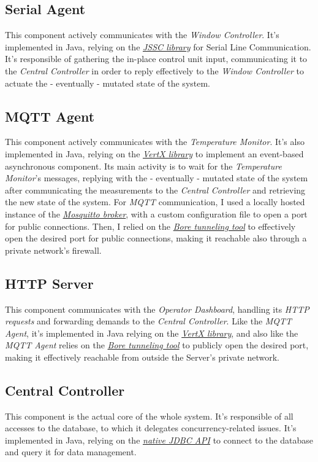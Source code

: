 \documentclass[a4paper,12pt]{report}
\begin{document}
		\subsection{Serial Agent}
		This component actively communicates with the \textit{Window Controller}. It's implemented in Java, relying on the \href{https://github.com/java-native/jssc}{\textit{JSSC library}} for Serial Line Communication. It's responsible of gathering the in-place control unit input, communicating it to the \textit{Central Controller} in order to reply effectively to the \textit{Window Controller} to actuate the - eventually - mutated state of the system.
		\subsection{MQTT Agent}
		This component actively communicates with the \textit{Temperature Monitor}. It's also implemented in Java, relying on the \href{https://vertx.io/}{\textit{VertX library}} to implement an event-based asynchronous component. Its main activity is to wait for the \textit{Temperature Monitor}'s messages, replying with the - eventually - mutated state of the system after communicating the measurements to the \textit{Central Controller} and retrieving the new state of the system.
		For \textit{MQTT} communication, I used a locally hosted instance of the \href{https://mosquitto.org/}{\textit{Mosquitto broker}}, with a custom configuration file to open a port for public connections. Then, I relied on the \href{https://github.com/ekzhang/bore}{\textit{Bore tunneling tool}} to effectively open the desired port for public connections, making it reachable also through a private network's firewall.
		\subsection{HTTP Server}
		This component communicates with the \textit{Operator Dashboard}, handling its \textit{HTTP requests} and forwarding demands to the \textit{Central Controller}. Like the \textit{MQTT Agent}, it's implemented in Java relying on the \href{https://vertx.io/}{\textit{VertX library}}, and also like the \textit{MQTT Agent} relies on the \href{https://github.com/ekzhang/bore}{\textit{Bore tunneling tool}} to publicly open the desired port, making it effectively reachable from outside the Server's private network.
		\subsection{Central Controller}
		This component is the actual core of the whole system. It's responsible of all accesses to the database, to which it delegates concurrency-related issues. It's implemented in Java, relying on the \href{https://docs.oracle.com/javase/8/docs/technotes/guides/jdbc/}{\textit{native JDBC API}} to connect to the database and query it for data management.
		
\end{document}
